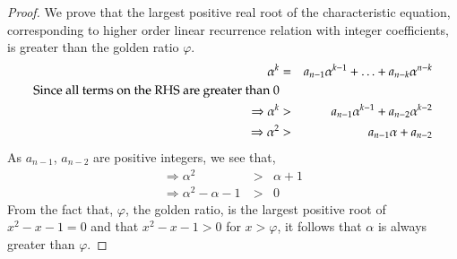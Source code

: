 \begin{multicols}{2}
\begin{proof}
We prove that the largest positive real root of the characteristic equation, corresponding to higher order linear recurrence relation with integer coefficients, is greater than the golden ratio $\varphi$.
\begin{eqnarray}
\alpha^{k} &=&  a_{n-1}\alpha^{k-1} + \ldots + a_{n-k}\alpha^{n-k} \nonumber\\
\textup{Since all terms on the RHS are greater than 0} \nonumber\\
\Rightarrow \alpha^{k} &>&  a_{n-1}\alpha^{k-1} + a_{n-2}\alpha^{k-2}\nonumber \\
\Rightarrow \alpha^{2} &>&  a_{n-1}\alpha + a_{n-2}\nonumber
\end{eqnarray}
As $a_{n-1}$, $a_{n-2}$ are positive integers, we see that,
\begin{eqnarray}
\Rightarrow \alpha^{2} &>&  \alpha + 1\nonumber\\
\label{alphaphicompare}\Rightarrow \alpha^{2} -  \alpha - 1\ &>& 0
\end{eqnarray}
From the fact that, $\varphi$, the golden ratio, is the largest positive root of $x^2-x-1 = 0$ and that $x^2-x-1 > 0$ for $x > \varphi$, it follows that
$\alpha$ is always greater than $\varphi$.
\end{proof}














\end{multicols}
